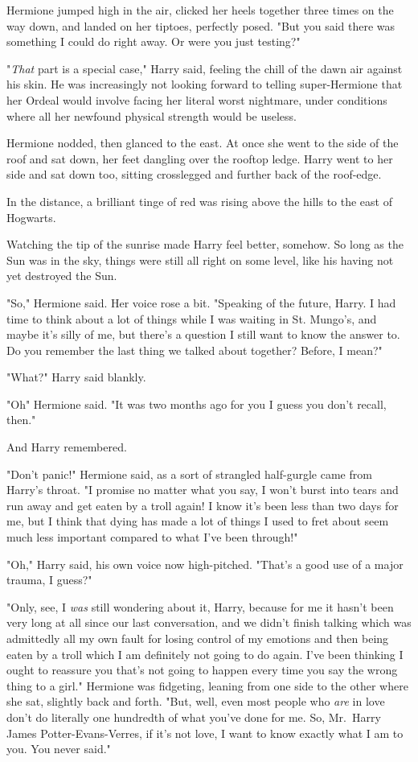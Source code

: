 Hermione jumped high in the air, clicked her heels together three times on the
way down, and landed on her tiptoes, perfectly posed. "But you said there was
something I could do right away. Or were you just testing?"

"\emph{That} part is a special case," Harry said, feeling the chill of the dawn
air against his skin. He was increasingly not looking forward to telling
super-Hermione that her Ordeal would involve facing her literal worst
nightmare, under conditions where all her newfound physical strength would be
useless.

Hermione nodded, then glanced to the east. At once she went to the side of the
roof and sat down, her feet dangling over the rooftop ledge. Harry went to her
side and sat down too, sitting crosslegged and further back of the roof-edge.

In the distance, a brilliant tinge of red was rising above the hills to the
east of Hogwarts.

Watching the tip of the sunrise made Harry feel better, somehow. So long as the
Sun was in the sky, things were still all right on some level, like his having
not yet destroyed the Sun.

"So," Hermione said. Her voice rose a bit. "Speaking of the future, Harry. I
had time to think about a lot of things while I was waiting in St. Mungo's,
and{\el} maybe it's silly of me, but there's a question I still want to know
the answer to. Do you remember the last thing we talked about together? Before,
I mean?"

"What?" Harry said blankly.

"Oh{\el}" Hermione said. "It was two months ago for you{\el} I guess you
don't recall, then."

And Harry remembered.

"Don't panic!" Hermione said, as a sort of strangled half-gurgle came from
Harry's throat. "I promise no matter what you say, I won't burst into tears and
run away and get eaten by a troll again! I know it's been less than two days
for me, but I think that dying has made a lot of things I used to fret about
seem much less important compared to what I've been through!"

"Oh," Harry said, his own voice now high-pitched. "That's a good use of a major
trauma, I guess?"

"Only, see, I \emph{was} still wondering about it, Harry, because for me it
hasn't been very long at all since our last conversation, and we didn't finish
talking which was admittedly all my own fault for losing control of my emotions
and then being eaten by a troll which I am definitely not going to do again.
I've been thinking I ought to reassure you that's not going to happen every
time you say the wrong thing to a girl." Hermione was fidgeting, leaning from
one side to the other where she sat, slightly back and forth. "But, well, even
most people who \emph{are} in love don't do literally one hundredth of what
you've done for me. So, Mr.~Harry James Potter-Evans-Verres, if it's not love,
I want to know exactly what I am to you. You never said."

